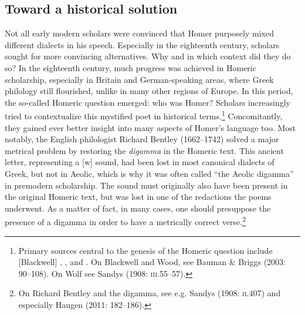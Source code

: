 \subsection{Toward a historical solution}
\hypertarget{Toc19704829}{}
Not all early modern scholars were convinced that Homer purposely mixed different dialects in his speech. Especially in the eighteenth century, scholars sought for more convincing alternatives. Why and in which context did they do so? In the eighteenth century, much progress was achieved in Homeric scholarship, especially in Britain and German-speaking areas, where Greek philology still flourished, unlike in many other regions of Europe. In this period, the so-called Homeric question emerged: who was Homer? Scholars increasingly tried to contextualize this mystified poet in historical terms.\footnote{Primary sources central to the genesis of the Homeric question include [Blackwell] , \citet{Wood1775}, and \citet{Wolf1795}. On Blackwell and Wood, see Bauman \& Briggs (2003: 90–108). On Wolf see Sandys (1908: \textsc{iii.}55–57).} Concomitantly, they gained ever better insight into many aspects of Homer’s language too. Most notably, the English philologist Richard Bentley (1662–1742) solved a major metrical problem by restoring the \textit{digamma} in the Homeric text. This ancient letter, representing a [w] sound, had been lost in most canonical dialects of Greek, but not in Aeolic, which is why it was often called “the Aeolic digamma” in premodern scholarship. The sound must originally also have been present in the original Homeric text, but was lost in one of the redactions the poems underwent. As a matter of fact, in many cases, one should presuppose the presence of a digamma in order to have a metrically correct verse.\footnote{On Richard Bentley and the digamma, see e.g. Sandys (1908: \textsc{ii.}407) and especially Haugen (2011: 182–186).}

